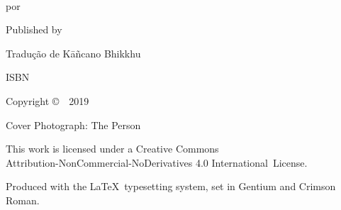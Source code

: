 \cleartoverso
\thispagestyle{empty}

{\copyrightsize
\centering
\setlength{\parindent}{0pt}%
\setlength{\parskip}{0.8\baselineskip}%

\thetitle\\
por \theauthor

Published by \thePublisher

Tradução de Kāñcano Bhikkhu

ISBN \theISBN

Copyright \copyright\ \thePublisher\ 2019


Cover Photograph: The Person

\vfill

{\footnotesize

This work is licensed under a Creative Commons\\
Attribution-NonCommercial-NoDerivatives 4.0 International~License.

Produced with the \LaTeX\ typesetting system, set in Gentium and Crimson Roman.

\theEditionInfo

}}
